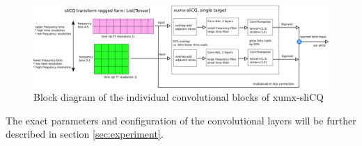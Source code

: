 \documentclass[report.tex]{subfiles}
\begin{document}
\begin{figure}[ht]
	\centering
	\includegraphics[width=\textwidth]{./images-blockdiagrams/xumx_slicq_pertarget.png}
	\caption{Block diagram of the individual convolutional blocks of xumx-sliCQ}
	\label{fig:cdaeslicqt}
\end{figure}

The exact parameters and configuration of the convolutional layers will be further described in section \ref{sec:experiment}.
\end{document}
